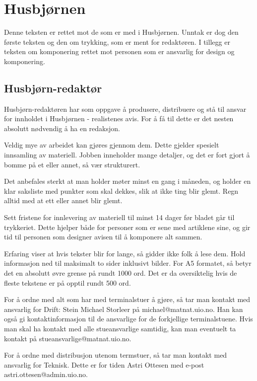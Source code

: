 
\section{Husbjørnen}

Denne teksten er rettet mot de som er med i Husbjørnen. Unntak er dog
den første teksten og den om trykking, som er ment for redaktøren. I
tillegg er teksten om komponering rettet mot personen som er ansvarlig
for design og komponering.

\subsection{Husbjørn-redaktør}
 Husbjørn-redaktøren har som oppgave å produsere, distribuere og stå
til ansvar for innholdet i Husbjørnen - realistenes avis. For å få til
dette er det nesten absolutt nødvendig å ha en redaksjon.

 Veldig mye av arbeidet kan gjøres gjennom dem. Dette gjelder spesielt
innsamling av materiell. Jobben inneholder mange detaljer, og det er
fort gjort å bomme på et eller annet, så vær strukturert.

 Det anbefales sterkt at man holder møter minst en gang i måneden, og
holder en klar saksliste med punkter som skal dekkes, slik at ikke
ting blir glemt. Regn alltid med at ett eller annet blir glemt.

 Sett fristene for innlevering av materiell til minst 14 dager før
bladet går til trykkeriet. Dette hjelper både for personer som er sene
med artiklene sine, og gir tid til personen som designer avisen til å
komponere alt sammen.

 Erfaring viser at hvis tekster blir for lange, så gidder ikke folk å
lese dem. Hold informasjon ned til maksimalt to sider inklusivt
bilder. For A5 formatet, så betyr det en absolutt øvre grense på rundt
1000 ord. Det er da oversiktelig hvis de fleste tekstene er på opptil
rundt 500 ord.

 For å ordne med alt som har med terminalstuer å gjøre, så tar man
kontakt med ansvarlig for Drift: Stein Michael Storleer på
michael@matnat.uio.no. Han kan også gi kontaktinformasjon til de
ansvarlige for de forkjellige terminalstuene. Hvis man skal ha kontakt
med alle stueansvarlige samtidig, kan man eventuelt ta kontakt på
stueansvarlige@matnat.uio.no.

 For å ordne med distribusjon utenom termstuer, så tar man kontakt med
ansvarlig for Teknisk. Dette er for tiden Astri Ottesen med e-post
astri.ottesen@admin.uio.no.

